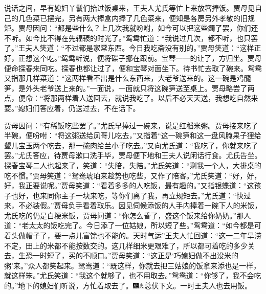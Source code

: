 说话之间，早有媳妇丫鬟们抬过饭桌来，王夫人尤氏等忙上来放箸捧饭。贾母见自己的几色菜已摆完，另有两大捧盒内捧了几色菜来，便知是各房另外孝敬的旧规矩。贾母因问：``都是些什么？上几次我就吩咐，如今可以把这些蠲了罢，你们还不听。如今比不得在先辐辏的时光了。''鸳鸯忙道：``我说过几次，都不听，也只罢了。''王夫人笑道：``不过都是家常东西。今日我吃斋没有别的。''贾母笑道：``这样正好，正想这个吃。''鸳鸯听说，便将碟子挪在跟前。宝琴一一的让了，方归坐。贾母便命探春来同吃。探春也都让过了，便和宝琴对面坐下。待书忙去取了碗来。鸳鸯又指那几样菜道：``这两样看不出是什么东西来，大老爷送来的。这一碗是鸡髓笋，是外头老爷送上来的。''一面说，一面就只将这碗笋送至桌上。贾母略尝了两点，便命：``将那两样着人送回去，就说我吃了。以后不必天天送，我想吃自然来要。''媳妇们答应着，仍送过去，不在话下。

贾母因问：``有稀饭吃些罢了。''尤氏早捧过一碗来，说是红稻米粥。贾母接来吃了半碗，便吩咐：``将这粥送给凤哥儿吃去，''又指着``这一碗笋和这一盘风腌果子狸给颦儿宝玉两个吃去，那一碗肉给兰小子吃去。''又向尤氏道：``我吃了，你就来吃了罢。''尤氏答应，待贾母漱口洗手毕，贾母便下地和王夫人说闲话行食。尤氏告坐。探春宝琴二人也起来了，笑道：``失陪，失陪。''尤氏笑道：``剩我一个人，大排桌的吃不惯。''贾母笑道：``鸳鸯琥珀来趁势也吃些，又作了陪客。''尤氏笑道：``好，好，好，我正要说呢。''贾母笑道：``看着多多的人吃饭，最有趣的。''又指银蝶道：``这孩子也好，也来同你主子一块来吃，等你们离了我，再立规矩去。''尤氏道：``快过来，不必装假。''贾母负手看着取乐。因见伺候添饭的人手内捧着一碗下人的米饭，尤氏吃的仍是白粳米饭，贾母问道：``你怎么昏了，盛这个饭来给你奶奶。''那人道：``老太太的饭吃完了。今日添了一位姑娘，所以短了些。''鸳鸯道：``{如今都是可着头做帽子了，要一点儿富馀也不能的。}{天时气运}''王夫人忙回道：``这一二年旱涝不定，田上的米都不能按数交的。这几样细米更艰难了，所以都可着吃的多少关去，生恐一时短了，买的不顺口。''贾母笑道：``这正是`巧媳妇做不出没米的粥'来。''众人都笑起来。鸳鸯道：``既这样，你就去把三姑娘的饭拿来添也是一样，就这样笨。''尤氏笑道：``我这个就够了，也不用取去。''鸳鸯道：``你够了，我不会吃的。''地下的媳妇们听说，方忙着取去了。{\includegraphics[width=3mm]{../Images/00004}\includegraphics[width=3mm]{../Images/00012}\footnotesize \kaishu 总伏下文。}一时王夫人也去用饭。

